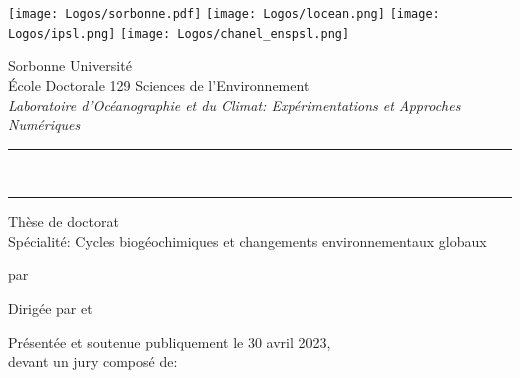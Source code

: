 

\begin{titlingpage}

\begin{center}
  \texttt{[image: Logos/sorbonne.pdf]}
  \hfill
  \texttt{[image: Logos/locean.png]}
  \hfill
  \texttt{[image: Logos/ipsl.png]}
  \hfill
  \texttt{[image: Logos/chanel\_enspsl.png]}

  \vspace{1cm}

  {\LARGE Sorbonne Université}\\[2ex]
  École Doctorale 129 Sciences de l'Environnement\\
  \emph{Laboratoire d'Océanographie et du Climat: Expérimentations et Approches Numériques}

  \vspace{3cm}

  \par\noindent\rule[0.7em]{\textwidth}{2pt}
  {\bfseries\Large \Title}\\
  \par\noindent\rule{\textwidth}{2pt}

  \vspace{3cm}

  Thèse de doctorat\\
  Spécialité: Cycles biogéochimiques et changements environnementaux globaux

  \vspace{1cm}

  {\normalsize par }

  \vspace{1cm}

  Dirigée par  et 

  \vspace{2cm}
\end{center}

\par\noindent Présentée et soutenue publiquement le 30 avril 2023,\\
devant un jury composé de:


\end{titlingpage}

\restoregeometry%
